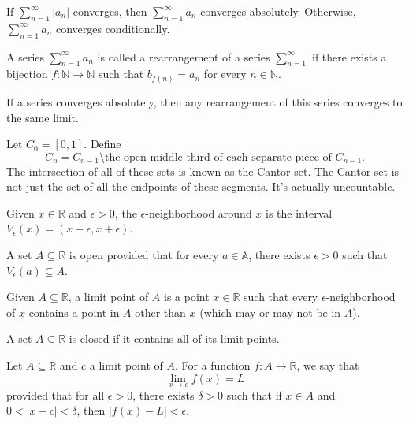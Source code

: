 \documentclass{article}
\begin{document}
    If $\sum\limits_{n=1}^\infty|a_n|$ converges, then $\sum\limits_{n=1}^\infty a_n$ converges absolutely. Otherwise, $\sum\limits_{n=1}^\infty a_n$ converges conditionally.
    
\medskip
{}

    A series $\sum\limits_{n=1}^\infty a_n$ is called a rearrangement of a series $\sum\limits_{n=1}^\infty$ if there exists a bijection $f:\mathbb N \to \mathbb N$ such that $b_{f(n)} = a_n$ for every $n \in \mathbb N$.
    
\medskip
{}

    If a series converges absolutely, then any rearrangement of this series converges to the same limit.

\medskip
{}

    Let $C_0 = [0,1]$. Define $$C_n = C_{n-1} \setminus \text{the open middle third of each separate piece of } C_{n-1}.$$ The intersection of all of these sets is known as the Cantor set. The Cantor set is not just the set of all the endpoints of these segments. It's actually uncountable.

\medskip
{}

    Given $x \in \mathbb R$ and $\epsilon > 0$, the $\epsilon$-neighborhood around $x$ is the interval $V_\epsilon(x) = (x-\epsilon, x + \epsilon)$.

\medskip
{}

    A set $A \subseteq \mathbb R$ is open provided that for every $a \in \mathbb A$, there exists $\epsilon > 0$ such that $V_\epsilon(a) \subseteq A$.

\medskip
{}

    Given $A \subseteq \mathbb R$, a limit point of $A$ is a point $x \in \mathbb R$ such that every $\epsilon$-neighborhood of $x$ contains a point in $A$ other than $x$ (which may or may not be in $A$).

\medskip
{}

    A set $A \subseteq \mathbb R$ is closed if it contains all of its limit points.

\medskip
{}

    Let $A \subseteq \mathbb R$ and $c$ a limit point of $A$. For a function $f: A \to \mathbb R$, we say that $$\lim_{x\to c}f(x)=L$$ provided that for all $\epsilon > 0$, there exists $\delta > 0$ such that if $x \in A$ and $0 < |x-c| < \delta$, then $|f(x)-L| < \epsilon$.
\end{document}
